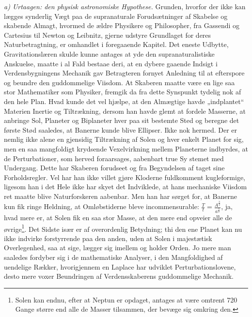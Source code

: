 \documentclass[12pt,a4paper]{book}
\newcommand{\runin}[1]{\emph{#1}\hspace{0.4em}}
\begin{document}
\runin{a) Urtaagen: den physisk astronomiske Hypothese.} Grunden, hvorfor der ikke kan lægges synderlig Vægt paa de supranaturale
Forudsætninger af Skabelse og skabende Almagt, hvormed de ældre
Physikere og Philosopher, fra Gassendi og Cartesius til Newton og
Leibnitz, gjerne udstyre Grundlaget for deres Naturbetragtning, er
omhandlet i foregaaende Kapitel. Det eneste Udbytte,
Gravitationslæren skulde kunne antages at yde den supranaturalistiske
Anskuelse, maatte i al Fald bestaae deri, at en dybere gaaende Indsigt i
Verdensbygningens Mechanik gav Betragteren fornyet Anledning til at
efterspore og beundre den guddommelige Viisdom. At Skaberen maatte være
en lige saa stor Mathematiker som Physiker, fremgik da fra dette
Synspunkt tydelig nok af den hele Plan. Hvad kunde det vel hjælpe, at
den Almægtige havde „indplantet“ Materien Inertie og Tiltrækning,
dersom han havde glemt at fordele Masserne, at anbringe Sol, Planeter og
Biplaneter hver paa sit bestemte Sted og beregne det første Stød
saaledes, at Banerne kunde blive Ellipser. Ikke nok hermed. Der er
nemlig ikke alene en gjensidig Tiltrækning af Solen og hver enkelt
Planet for sig, men en saa mangfoldigt krydsende Vexelvirkning mellem
Planeterne indbyrdes, at de Perturbationer, som herved foraarsages,
aabenbart true Sy\-%
stemet med Undergang. Dette har Skaberen forudseet og fra Begyndelsen
af taget sine Forholdsregler. Vel har han ikke villet gjøre Kloderne
fuldkomment kugleformige, ligesom han i det Hele ikke har skyet det
Indviklede, at hans mechaniske Viisdom ret maatte blive Naturforskeren
aabenbar. Men han har sørget for, at Banerne kun fik ringe Heldning, at
Omløbstiderne bleve incommensurable:
$\frac{T}{t} = \frac{A^{\frac{3}{2}}}{a^{\frac{3}{2}}}$,
ja, hvad mere er, at Solen fik en saa stor Masse, at den mere end
opveier alle de øvrige\footnote{%
Solen kan endnu, efter at Neptun er opdaget, antages at være omtrent 720
Gange større end alle de Masser tilsammen, der bevæge sig omkring den.}.
Det Sidste især er af overordenlig Betydning; thi den ene Planet kan nu
ikke indvirke forstyrrende paa den anden, uden at Solen i majestætisk
Overlegenhed, saa at sige, lægger sig imellem og holder Orden. Jo mere
man saaledes fordyber sig i de mathematiske Analyser, i den
Mangfoldighed af uendelige Rækker, hvorigjennem en Laplace har udviklet
Perturbationslovene, desto mere voxer Beundringen af Verdensskaberens
guddommelige Mechanik.
\end{document}
